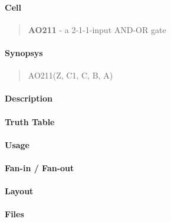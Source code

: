 \label{AO211}
\paragraph{Cell}
\begin{quote}
    \textbf{AO211} - a 2-1-1-input AND-OR gate
\end{quote}

\paragraph{Synopsys}
\begin{quote}
    AO211(Z, C1, C, B, A)
\end{quote}

\paragraph{Description}

%

\paragraph{Truth Table}
%

\paragraph{Usage}

\paragraph{Fan-in / Fan-out}

\paragraph{Layout}

\paragraph{Files}
